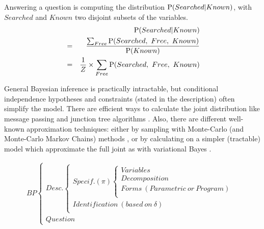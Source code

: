 Answering a question is computing the distribution $\mathrm{P}(Searched | Known)$, with $Searched$ and $Known$ two disjoint subsets of the variables. 
\begin{eqnarray}
& & \mathrm{P}(Searched | Known) \\
& = & \frac{\sum_{Free}\mathrm{P}(Searched,\ Free,\ Known)}{\mathrm{P}(Known)} \\
& = & \frac{1}{Z}\times \sum_{Free} \mathrm{P}(Searched,\ Free,\ Known)
\end{eqnarray}

General Bayesian inference is practically intractable, but conditional independence hypotheses and constraints (stated in the description) often simplify the model. There are efficient ways to calculate the joint distribution like message passing and junction tree algorithms \citep{Pearl,AjiM00,Nai04,mekhnacha,Koller}. Also, there are different well-known approximation techniques: either by sampling with Monte-Carlo (and Monte-Carlo Markov Chains) methods \citep{MacKay,Andrieu}, or by calculating on a simpler (tractable) model which approximate the full joint as with variational Bayes \citep{Beal}.

\begin{eqnarray*}
BP
\begin{cases}
Desc.
\begin{cases}
Specif. (\pi)
\begin{cases}
Variables\\
Decomposition\\
Forms\ (Parametric\ or\ Program)\\
\end{cases}\\
Identification\ (based\ on\ \delta)\\
\end{cases}\\
Question
\end{cases}
\end{eqnarray*}


